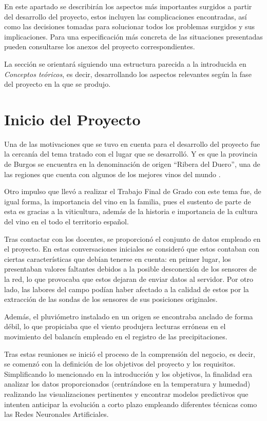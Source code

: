 
En este apartado se describirán los aspectos más importantes surgidos a partir del desarrollo del proyecto,
estos incluyen las complicaciones encontradas, así como las decisiones tomadas para solucionar todos los
problemas surgidos y sus implicaciones.
Para una especificación más concreta de las situaciones presentadas pueden consultarse los anexos del proyecto correspondientes.

La sección se orientará siguiendo una estructura parecida a la introducida en \textit{Conceptos teóricos}, 
es decir, desarrollando los aspectos relevantes según la fase del proyecto en la que se produjo.

\section{Inicio del Proyecto}
Una de las motivaciones que se tuvo en cuenta para el desarrollo del proyecto fue la cercanía del tema tratado
con el lugar que se desarrolló. Y es que la provincia de Burgos se encuentra en la denominación de
origen ``Ribera del Duero'', una de las regiones que cuenta con algunos de los mejores vinos del mundo \cite{misc:abc2021}.

Otro impulso que llevó a realizar el Trabajo Final de Grado con este tema fue, de igual forma, la importancia 
del vino en la familia, pues el sustento de parte de esta es gracias a la viticultura, además de la historia
e importancia de la cultura del vino en el todo el territorio español.

Tras contactar con los docentes, se proporcionó el conjunto de datos empleado en el proyecto. En estas conversaciones
iniciales se consideró que estos contaban con ciertas características que debían tenerse en cuenta: en primer lugar,
los presentaban valores faltantes debidos a la posible desconexión de los sensores de la red, lo que provocaba
que estos dejaran de enviar datos al servidor. Por otro lado, las labores del campo podían haber afectado a la calidad
de estos por la extracción de las sondas de los sensores de sus posiciones originales.

Además, el pluviómetro instalado en un origen se encontraba anclado de forma débil, lo que propiciaba que el viento 
produjera lecturas erróneas en el movimiento del balancín empleado en el registro de las precipitaciones.

Tras estas reuniones se inició el proceso de la comprensión del negocio, es decir, se comenzó con la definición de los 
objetivos del proyecto y los requisitos. Simplificando lo mencionado en la introducción y los objetivos,
la finalidad era analizar los datos proporcionados (centrándose en la temperatura y humedad) realizando
las visualizaciones pertinentes y encontrar modelos predictivos que intenten anticipar la evolución a corto plazo
empleando diferentes técnicas como las Redes Neuronales Artificiales.

